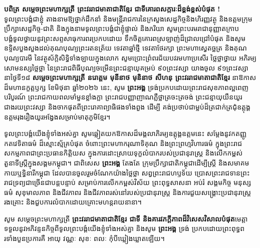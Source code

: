 \begingroup

\textbf{បពិត្រ សម្តេចព្រះមហាក្សត្រី ព្រះវររាជមាតាជាតិខ្មែរ ជាទីគោរពសក្ការៈដ៏ខ្ពង់ខ្ពស់បំផុត !}\\
ទូលព្រះបង្គំជាខ្ញុំ តាងនាមឱ្យថ្នាក់ដឹកនាំ និងមន្ត្រីរាជការនៃក្រសួងសេដ្ឋកិច្ចនិងហិរញ្ញវត្ថុ និងឧត្តមក្រុមប្រឹក្សាសេដ្ឋកិច្ច-ជាតិ និងក្នុងនាមទូលព្រះបង្គំជាខ្ញុំផ្ទាល់ និងភរិយា សូមព្រះបរមរាជានុញ្ញាតក្រាបបង្គំទូលថ្វាយនូវព្រះសព្ទសាធុការពរប្រកបដោយ ទឹកចិត្តគោរពស្រឡាញ់ដ៏ជ្រាលជ្រៅបំផុត និងសូមឧទ្ទិសបួងសួងដល់គុណបុណ្យព្រះរតនត្រ័យ ទេវតាឆ្នាំថ្មី ទេវតាថែរក្សា ព្រះមហាស្វេតច្ឆត្រ និងគុណបុណ្យបារមី នៃវត្ថុស័ក្តិសិទ្ធិទាំងឡាយក្នុងលោក សូមប្រោះព្រំពរជ័យបវរមហាប្រសើរ ថ្លៃថ្លាថ្វាយ អភិរម្យសោមនស្សថ្លៃថ្លា នៃព្រះរាជពិធីបុណ្យចម្រើនព្រះជន្មាយុគម្រប់ ៩០ព្រះវស្សា យាងចូល ៩១ព្រះវស្សា នាថ្ងៃទី១៨ \textbf{សម្តេចព្រះមហាក្សត្រី នរោត្តម មុនីនាថ មុនិនាថ សីហនុ ព្រះវររាជមាតាជាតិខ្មែរ} នាឱកាសដ៏មហានក្ខត្តឫក្ស ខែមិថុនា ឆ្នាំ២០២៦ នេះ, សូម \textbf{ព្រះអង្គ} ទ្រង់ប្រកបដោយព្រះរាជសុខភាពល្អពេញបរិបូរណ៍ ព្រះរាជកាយពលមាំមួនខ្លាំងក្លា ព្រះរាជបញ្ញាញាណភ្លឺថ្លាត្រចះត្រចង់ ព្រះជន្មាយុយឺនយូរជាងរយព្រះវស្សា និងចាកផុតពីព្រះរោគាព្យាធិផងទាំងពួង ដើម្បី គង់ប្រថាប់ជាម្លប់ដ៏ត្រជាក់ត្រជុំឧត្តុង្គឧត្តមរុងរឿងយូរអង្វែងសម្រាប់មាតុភូមិខ្មែរ។

ទូលព្រះបង្គំយើងខ្ញុំទាំងអស់គ្នា សូមឆ្លៀតយកឱកាសដ៏មង្គលាភិរម្យឧត្តុង្គឧត្តមនេះ សម្តែងនូវកតញ្ញូកតវេទិតាធម៌ ដ៏ស្មោះស្ម័គ្របំផុត ចំពោះព្រះមហាករុណាទិគុណ និងព្រះព្រហ្មវិហារធម៌ ក្នុងព្រះរាជសកម្មភាពជាព្រះប្រធានកិត្តិយស  ក្នុងការដោះស្រាយទុក្ខលំបាករបស់ប្រជានុរាស្ត្រ និងលើកកម្ពស់តួនាទីស្ត្រីក្នុងសង្គមកម្ពុជា។ ជាពិសេស \textbf{ព្រះអង្គ} តែងតែ ក្រុមប្រឹក្សាជាតិកម្ពុជាដើម្បីស្ត្រី និងសមាគមកាយឬទ្ធិនារីកម្ពុជា ដែលបានចូលរួមចំណែកយ៉ាងថ្លៃថ្លា សព្វព្រះរាជហឫទ័យ ប្រោសព្រះរាជទានព្រះរាជទ្រព្យជាច្រើនជាបន្តបន្ទាប់ សម្រាប់ការលើកកម្ពស់វិស័យ ព្រះពុទ្ធសាសនា អប់រំ សង្គមកិច្ច មនុស្សធម៌ សុខុមាលភាព និងជីវភាពរ និងជីវភាពរស់នៅរបស់ប្រជានុរាស្ត្រ និងការជួយសង្គ្រោះប្រជានុរាស្ត្ររងគ្រោះ និងជួបការលំបាកដោយគ្រោះមហន្តរាយនានា។

សូម សម្តេចព្រះមហាក្សត្រី \textbf{ព្រះវររាជមាតាជាតិខ្មែរ ជាទី និងគារវភក្តីភាពដ៏វិសេសវិសាលបំផុត}​មេត្តាទទួលនូវអភិវន្ទនកិច្ចពីទូលព្រះបង្គំយើងខ្ញុំទាំងអស់គ្នា និងសូម \textbf{ព្រះអង្គ} ទ្រង់ ប្រកបដោយព្រះពុទ្ធពរទាំងបួនប្រការគឺ អាយុ វណ្ណៈ សុខៈ ពលៈ កុំបីឃ្លៀងឃ្លាតឡើយ។
\endgroup
